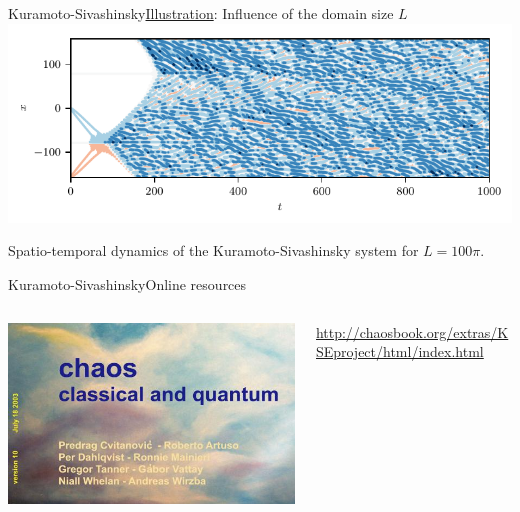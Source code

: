 \documentclass[usenames,dvipsnames,svgnames,10pt,aspectratio=169]{beamer}
\begin{document}
\begin{frame}[t, c]{Kuramoto-Sivashinsky}{\underline{Illustration}: Influence of the domain size $L$}
	\centering
	\includegraphics[width=.75\textwidth]{kuramoto_sivashinsky_large_domain}

	Spatio-temporal dynamics of the Kuramoto-Sivashinsky system for $L = 100 \pi$.

	\vspace{1cm}
\end{frame}

\begin{frame}[t, c]{Kuramoto-Sivashinsky}{Online resources}
	  \begin{minipage}{.9\textwidth}
			\begin{columns}
				\begin{column}{.2\textwidth}
					\centering
					\includegraphics[height=.15\textheight]{chaosbook}
				\end{column}
				\begin{column}{.7\textwidth}
					\url{http://chaosbook.org/extras/KSEproject/html/index.html}
				\end{column}
			\end{columns}
		\end{minipage}
\end{frame}


\end{document}
